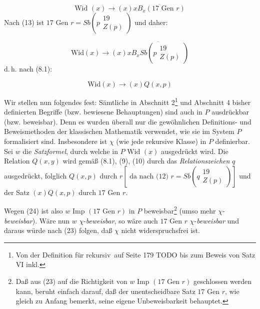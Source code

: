 \documentclass[draft]{scrartcl}
\begin{document}
\begin{equation*}
\text{Wid }\left(x\right) \longrightarrow \left(x\right)\overline{x B_x \left(17\text{ Gen } r\right)}
\end{equation*}
Nach (13) ist $17\text{ Gen } r = Sb\left(p\substack{19\\ Z\left(p\right)}\right)$ und daher:

\begin{equation*}
\text{Wid}\left(x\right) \longrightarrow\left(x\right)\overline{x B_x Sb\left(p\substack{19\\ Z\left(p\right)}\right)}
\end{equation*}
d.\,h. nach (8.1):

\begin{equation}
\text{Wid}\left(x\right) \longrightarrow \left(x\right) Q\left(x, p\right)
\end{equation}

Wir stellen nun folgendes fest: Sämtliche in Abschnitt 2\footnote{Von der Definition für 
\glqq rekursiv\grqq\ auf Seite 179 TODO bis zum Beweis von Satz VI inkl.}
und Abschnitt 4 bisher definierten Begriffe (bzw. bewiesene Behauptungen) sind auch in 
$P$ ausdrückbar (bzw. beweisbar). Denn es wurden überall nur die gewöhnlichen Definitions-
und Beweismethoden der klassischen Mathematik verwendet, wie sie im System $P$ formalisiert 
sind. Insbesondere ist $\chi$ (wie jede rekursive Klasse) in $P$ definierbar. 
Sei $w$ die \textit{Satzformel}, durch welche in $P\text{ Wid } \left(x\right)$ 
ausgedrückt wird. Die Relation $Q\left(x, y\right)$ wird gemäß (8.1), (9), (10) 
durch das \textit{Relationszeichen} $q$ ausgedrückt, folglich 
$Q\left(x, p\right)$ durch $r \left[\text{ da nach (12) } r = Sb\left(q\substack{19\\ Z\left(p\right)}\right)\right]$ 
und der Satz $\left(x\right)Q\left(x, p\right)$ durch $17\text{ Gen } r$.

Wegen (24) ist also $w\text{ Imp } \left(17\text{ Gen }r\right)$
in $P$ beweisbar\footnote{Daß aus (23) auf die Richtigkeit von
$w\text{ Imp }\left(17\text{ Gen } r\right)$
geschlossen werden kann, beruht einfach darauf, daß der unentscheidbare Satz%
$17\text{ Gen }r$, wie gleich zu Anfang bemerkt, seine eigene Unbeweisbarkeit behauptet.} 
(umso mehr $\chi$-\textit{beweisbar}). Wäre nun $w$ $\chi$-\textit{beweisbar}, 
so wäre auch $17\text{ Gen }r$ $\chi$-\textit{beweisbar} und daraus würde nach (23) 
folgen, daß $\chi$ nicht widerspruchsfrei ist.
\end{document}
